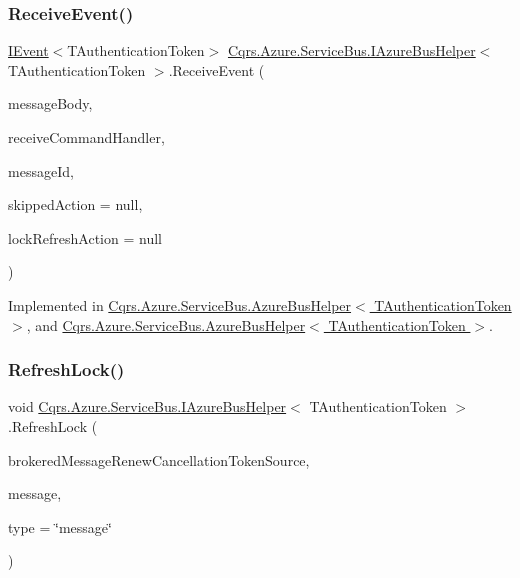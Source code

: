 \subsubsection{\texorpdfstring{Receive\+Event()}{ReceiveEvent()}}
{\footnotesize\ttfamily \hyperlink{interfaceCqrs_1_1Events_1_1IEvent}{I\+Event}$<$T\+Authentication\+Token$>$ \hyperlink{interfaceCqrs_1_1Azure_1_1ServiceBus_1_1IAzureBusHelper}{Cqrs.\+Azure.\+Service\+Bus.\+I\+Azure\+Bus\+Helper}$<$ T\+Authentication\+Token $>$.Receive\+Event (\begin{DoxyParamCaption}\item[{string}]{message\+Body,  }\item[{Func$<$ \hyperlink{interfaceCqrs_1_1Events_1_1IEvent}{I\+Event}$<$ T\+Authentication\+Token $>$, bool?$>$}]{receive\+Command\+Handler,  }\item[{string}]{message\+Id,  }\item[{Action}]{skipped\+Action = {\ttfamily null},  }\item[{Action}]{lock\+Refresh\+Action = {\ttfamily null} }\end{DoxyParamCaption})}



Implemented in \hyperlink{classCqrs_1_1Azure_1_1ServiceBus_1_1AzureBusHelper_ae25e1c5b54e32e79d37bbcd2fd73c70d_ae25e1c5b54e32e79d37bbcd2fd73c70d}{Cqrs.\+Azure.\+Service\+Bus.\+Azure\+Bus\+Helper$<$ T\+Authentication\+Token $>$}, and \hyperlink{classCqrs_1_1Azure_1_1ServiceBus_1_1AzureBusHelper_ae25e1c5b54e32e79d37bbcd2fd73c70d_ae25e1c5b54e32e79d37bbcd2fd73c70d}{Cqrs.\+Azure.\+Service\+Bus.\+Azure\+Bus\+Helper$<$ T\+Authentication\+Token $>$}.

\mbox{\label{interfaceCqrs_1_1Azure_1_1ServiceBus_1_1IAzureBusHelper_a51988703dad9dc41c834e620e4e6e31a_a51988703dad9dc41c834e620e4e6e31a}} 
\subsubsection{\texorpdfstring{Refresh\+Lock()}{RefreshLock()}}
{\footnotesize\ttfamily void \hyperlink{interfaceCqrs_1_1Azure_1_1ServiceBus_1_1IAzureBusHelper}{Cqrs.\+Azure.\+Service\+Bus.\+I\+Azure\+Bus\+Helper}$<$ T\+Authentication\+Token $>$.Refresh\+Lock (\begin{DoxyParamCaption}\item[{Cancellation\+Token\+Source}]{brokered\+Message\+Renew\+Cancellation\+Token\+Source,  }\item[{Brokered\+Message}]{message,  }\item[{string}]{type = {\ttfamily \char`\"{}message\char`\"{}} }\end{DoxyParamCaption})}



